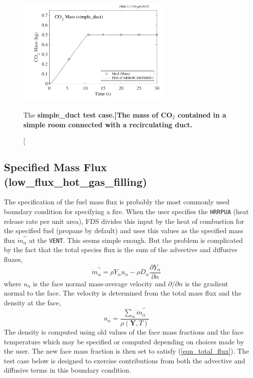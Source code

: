 \documentclass[11pt]{book}
\newcommand{\ct}{\tt\small}
\begin{document}
\begin{figure}[h]
      \includegraphics[width=3in]{SCRIPT_FIGURES/simple_duct_mass}
   \caption[The \bf{simple\_duct} test case.]{The mass of CO$_2$ contained in a simple room connected with a recirculating duct.}
   \label{simple_duct}
\end{figure}


\clearpage

\subsection{Specified Mass Flux (low\_flux\_hot\_gas\_filling)}

The specification of the fuel mass flux is probably the most commonly used boundary condition for specifying a fire.  When the user specifies the {\ct HRRPUA} (heat release rate per unit area), FDS divides this input by the heat of combustion for the specified fuel (propane by default) and uses this values as the specified mass flux $\dot{m}_{\alpha}^{\prime\prime}$ at the {\ct VENT}.  This seems simple enough.  But the problem is complicated by the fact that the total species flux is the sum of the advective and diffusive fluxes,
\begin{equation}
\label{eqn_total_flux}
\dot{m}_{\alpha}^{\prime\prime} = \rho Y_{\alpha} u_n - \rho D_\alpha \frac{\partial Y_\alpha}{\partial n}
\end{equation}
where $u_n$ is the face normal mass-average velocity and $\partial/\partial n$ is the gradient normal to the face.  The velocity is determined from the total mass flux and the density at the face,
\begin{equation}
\label{eqn_un}
u_n = \frac{\sum_\alpha \dot{m}_{\alpha}^{\prime\prime}}{\rho(\mathbf{Y},T)}
\end{equation}
The density is computed using old values of the face mass fractions and the face temperature which may be specified or computed depending on choices made by the user.  The new face mass fraction is then set to satisfy (\ref{eqn_total_flux}).  The test case below is designed to exercise contributions from both the advective and diffusive terms in this boundary condition.
\end{document}
